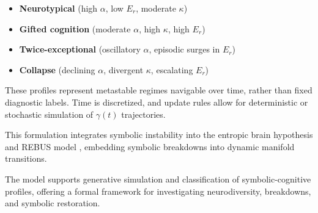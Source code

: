 \begin{itemize}
    \item \textbf{Neurotypical} (high $\alpha$, low $E_r$, moderate $\kappa$)
    \item \textbf{Gifted cognition} (moderate $\alpha$, high $\kappa$, high $E_r$)
    \item \textbf{Twice-exceptional} (oscillatory $\alpha$, episodic surges in $E_r$)
    \item \textbf{Collapse} (declining $\alpha$, divergent $\kappa$, escalating $E_r$)
\end{itemize}

These profiles represent metastable regimes navigable over time, rather than fixed diagnostic labels. Time is discretized, and update rules allow for deterministic or stochastic simulation of $\gamma(t)$ trajectories.

This formulation integrates symbolic instability into the entropic brain hypothesis \cite{CarhartHarris2014} and REBUS model \cite{CarhartHarris2019}, embedding symbolic breakdowns into dynamic manifold transitions.

The model supports generative simulation and classification of symbolic-cognitive profiles, offering a formal framework for investigating neurodiversity, breakdowns, and symbolic restoration.